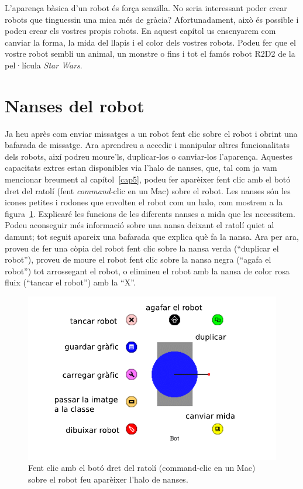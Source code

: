 L'aparença bàsica d'un robot és força senzilla. No seria interessant poder crear robots que tinguessin una mica més de gràcia? Afortunadament, això és possible i podeu crear els vostres propis robots. En aquest capítol us ensenyarem com canviar la forma, la mida del llapis i el color dels vostres robots. Podeu fer que el vostre robot sembli un animal, un monstre o fins i tot el famós robot R2D2 de la pel·lícula \emph{Star Wars}.

\section{Nanses del robot}

Ja heu après com enviar missatges a un robot fent clic sobre el robot i obrint  una bafarada de missatge. Ara aprendreu a accedir i manipular altres funcionalitats dels robots, així podreu moure'ls, duplicar-los o canviar-los l'aparença. Aquestes capacitats extres estan disponibles via l'halo de nanses, que, tal com ja vam mencionar breument al capítol~\ref{cap5}, podeu fer aparèixer fent clic amb el botó dret del ratolí (fent \emph{command}-clic en un Mac) sobre el robot. Les nanses són les icones petites i rodones que envolten el robot com un halo, com mostrem a la figura~\ref{fig0601}. Explicaré les funcions de les diferents nanses a mida que les necessitem. Podeu aconseguir més informació sobre una nansa deixant el ratolí quiet al damunt; tot seguit apareix una bafarada que explica què fa la nansa. Ara per ara, proveu de fer una còpia del robot fent clic sobre la nansa verda (``duplicar el robot''), proveu de moure el robot fent clic sobre la nansa negra (``agafa el robot'') tot arrossegant el robot, o elimineu el robot amb la nansa de color rosa fluix (``tancar el robot'') amb la ``X''.

\begin{figure}[h]
\begin{center}
\includegraphics[scale=0.65]{Imatges/figura6-1} 
\end{center}
\caption{Fent clic amb el botó dret del ratolí (command-clic en un Mac) sobre el robot feu aparèixer l'halo de nanses.}
\label{fig0601}
\end{figure}

